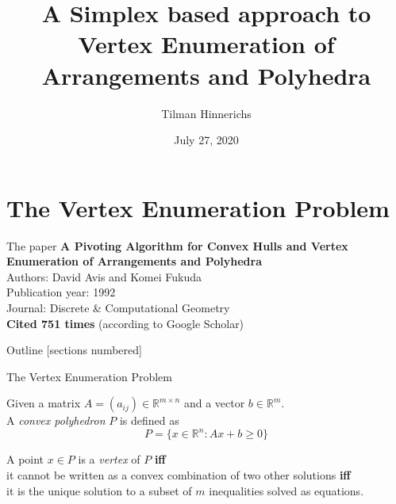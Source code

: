 \documentclass[10pt]{beamer}
\title{A Simplex based approach to Vertex Enumeration of Arrangements and Polyhedra}
\author{Tilman Hinnerichs}
\institute{Seminar \glqq Selected Topics in Logic and Verification\grqq{} -- TU Dresden}
\date{July 27, 2020}
\begin{document}
	
\begin{frame}{}
	\titlepage
\end{frame}

\section{The Vertex Enumeration Problem}
\begin{frame}{The paper}
	\textbf{\large{\glqq A Pivoting Algorithm for Convex Hulls and Vertex Enumeration of Arrangements and Polyhedra\grqq{}}}\\
	\vspace{0.5cm}
	Authors: David Avis and Komei Fukuda\\
	Publication year: 1992\\
	Journal: Discrete \& Computational Geometry\\
	\pause 
	\textbf{Cited 751 times} (according to Google Scholar)
	
\end{frame}

\begin{frame}{Outline}
	[sections numbered]
	\tableofcontents
\end{frame}


\begin{frame}{The Vertex Enumeration Problem}
	\begin{definition}
		Given a matrix $A=(a_{ij}) \in \mathbb{R}^{m\times n}$ and a vector $b \in \mathbb{R}^m$.\\
		
		A \textit{convex polyhedron} $P$ is defined as
		\begin{equation}
			P = \{ x\in \mathbb{R}^n: Ax+b\geq 0 \}
		\end{equation}
	\end{definition}
	\pause 
	\begin{definition}
		A point $x\in P$ is a \textit{vertex} of $P$ \textbf{iff}\\
		it cannot be written as a convex combination of two other solutions \textbf{iff}\\
		it is the unique solution to a subset of $m$ inequalities solved as equations. 
	\end{definition}
	
\end{frame}
\end{document}

